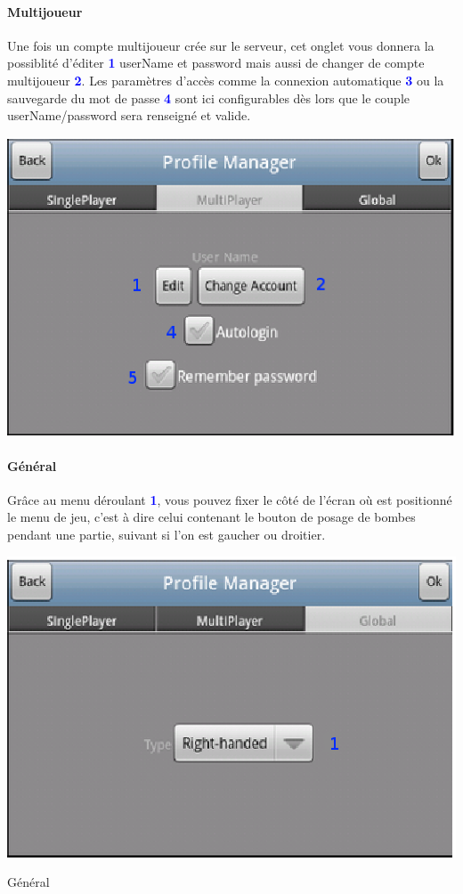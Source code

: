 		\paragraph{Multijoueur\\}
		Une fois un compte multijoueur crée sur le serveur, cet onglet vous donnera la
		possiblité d'éditer \textcolor{blue}{\textbf{1}} userName et password mais
		aussi de changer de compte multijoueur \textcolor{blue}{\textbf{2}}. Les
		paramètres d'accès comme la connexion automatique
		\textcolor{blue}{\textbf{3}} ou la sauvegarde du mot de passe
		\textcolor{blue}{\textbf{4}} sont ici configurables dès lors que le couple
		userName/password sera renseigné et valide.
		
		\begin{center}
				\includegraphics[scale=0.8]{Manuel/Img/6.eps}
		\end{center}
		
		\newpage{}	
		\paragraph{Général\\}
		Grâce au menu déroulant \textcolor{blue}{\textbf{1}}, vous pouvez fixer le
		côté de l'écran où est positionné le menu de jeu, c'est à dire celui contenant
		le bouton de posage de bombes pendant une partie, suivant si l'on est gaucher ou droitier. 
		
		\begin{center}
				\includegraphics[scale=0.8]{Manuel/Img/7.eps}
				\caption{Général}
		\end{center}
			
